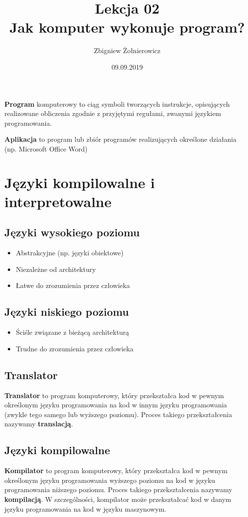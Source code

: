 \documentclass[a4paper]{article}
\begin{document}
\title{{\huge Lekcja 02} \\
    {\large Jak komputer wykonuje program?}}
\author{Zbigniew Żołnierowicz}
\date{09.09.2019}
\maketitle
\textbf{Program} komputerowy to ciąg symboli tworzących instrukcje, opisujących realizowane obliczenia zgodnie z przyjętymi regułami, zwanymi językiem programowania.

\textbf{Aplikacja} to program lub zbiór programów realizujących określone działania (np. Microsoft Office Word)
\section{Języki kompilowalne i interpretowalne}
\subsection{Języki wysokiego poziomu}
\begin{itemize}
    \item Abstrakcyjne (np. języki obiektowe)
    \item Niezależne od architektury
    \item Łatwe do zrozumienia przez człowieka
\end{itemize}
\subsection{Języki niskiego poziomu}
\begin{itemize}
    \item Ściśle związane z bieżącą architekturą
    \item Trudne do zrozumienia przez człowieka
\end{itemize}
\subsection{Translator}
\textbf{Translator} to program komputerowy, który przekształca kod w pewnym określonym języku programowania na kod w innym języku programowania (zwykle tego samego lub wyższego poziomu). Proces takiego przekształcenia nazywamy \textbf{translacją}.
\pagebreak
\subsection{Języki kompilowalne}
\textbf{Kompilator} to program komputerowy, który przekształca kod w pewnym określonym języku programowania wyższego poziomu na kod w języku programowania niższego poziomu. Proces takiego przekształcenia nazywamy \textbf{kompilacją}. W szczególności, kompilator może przekształcać kod w danym języku programowania na kod w języku maszynowym.
\end{document}
